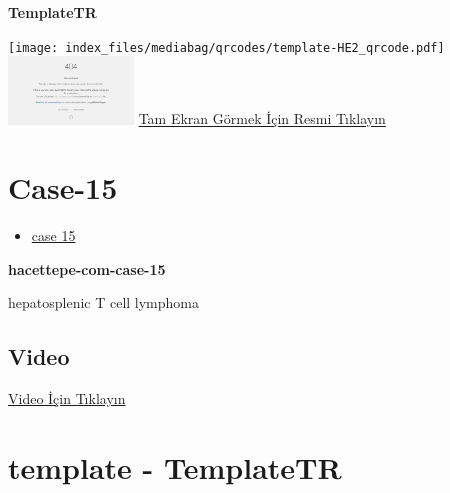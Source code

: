 \documentclass[
  letterpaper,
  DIV=11,
  numbers=noendperiod]{scrreprt}
\providecommand{\tightlist}{%
  \setlength{\itemsep}{0pt}\setlength{\parskip}{0pt}}\usepackage{longtable,booktabs,array}
\begin{document}
\textbf{TemplateTR}

\texttt{[image: index\_files/mediabag/qrcodes/template-HE2\_qrcode.pdf]}
\href{https://images.patolojiatlasi.com/template/HE2.html}{\includegraphics[width=0.25\textwidth,height=\textheight]{./screenshots/thumbnail_template-HE2.png}}
\href{https://images.patolojiatlasi.com/template/HE2.html}{Tam Ekran
Görmek İçin Resmi Tıklayın}

\hypertarget{sec-hacettepe-case-of-the-month-case-15}{%
\section{Case-15}\label{sec-hacettepe-case-of-the-month-case-15}}

\begin{itemize}
\tightlist
\item
  \href{https://www.youtube.com/watch?v=3lmx9hYGcG8&ab_channel=KemalKosemehmetoglu}{case
  15}
\end{itemize}

\textbf{hacettepe-com-case-15}

\begin{tcolorbox}[enhanced jigsaw, breakable, opacitybacktitle=0.6, arc=.35mm, colbacktitle=quarto-callout-tip-color!10!white, colback=white, toptitle=1mm, left=2mm, opacityback=0, colframe=quarto-callout-tip-color-frame, titlerule=0mm, rightrule=.15mm, bottomrule=.15mm, toprule=.15mm, bottomtitle=1mm, title=\textcolor{quarto-callout-tip-color}{\faLightbulb}\hspace{0.5em}{Tanı}, coltitle=black, leftrule=.75mm]

hepatosplenic T cell lymphoma

\end{tcolorbox}

\hypertarget{video-14}{%
\subsection{Video}\label{video-14}}

\href{https://www.youtube.com/watch?v=3lmx9hYGcG8}{Video İçin Tıklayın}

\hypertarget{sec-template}{%
\section{template - TemplateTR}\label{sec-template}}
\end{document}

